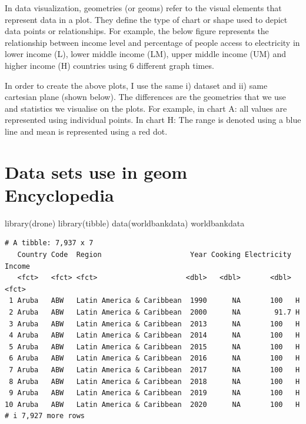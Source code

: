 \documentclass[
  letterpaper,
  DIV=11,
  numbers=noendperiod]{scrreprt}
\newenvironment{Shaded}{\begin{snugshade}}{\end{snugshade}}
\newcommand{\FunctionTok}[1]{\textcolor[rgb]{0.28,0.35,0.67}{#1}}
\newcommand{\NormalTok}[1]{\textcolor[rgb]{0.00,0.23,0.31}{#1}}
\begin{document}

In data visualization, geometries (or geoms) refer to the visual
elements that represent data in a plot. They define the type of chart or
shape used to depict data points or relationships. For example, the
below figure represents the relationship between income level and
percentage of people access to electricity in lower income (L), lower
middle income (LM), upper middle income (UM) and higher income (H)
countries using 6 different graph times.

In order to create the above plots, I use the same i) dataset and ii)
same cartesian plane (shown below). The differences are the geometries
that we use and statistics we visualise on the plots. For example, in
chart A: all values are represented using individual points. In chart H:
The range is denoted using a blue line and mean is represented using a
red dot.

\section*{Data sets use in geom
Encyclopedia}\label{data-sets-use-in-geom-encyclopedia}


\begin{Shaded}
\begin{Highlighting}[]
\FunctionTok{library}\NormalTok{(drone)}
\FunctionTok{library}\NormalTok{(tibble)}
\FunctionTok{data}\NormalTok{(worldbankdata)}
\NormalTok{worldbankdata}
\end{Highlighting}
\end{Shaded}

\begin{verbatim}
# A tibble: 7,937 x 7
   Country Code  Region                     Year Cooking Electricity Income
   <fct>   <fct> <fct>                     <dbl>   <dbl>       <dbl> <fct> 
 1 Aruba   ABW   Latin America & Caribbean  1990      NA       100   H     
 2 Aruba   ABW   Latin America & Caribbean  2000      NA        91.7 H     
 3 Aruba   ABW   Latin America & Caribbean  2013      NA       100   H     
 4 Aruba   ABW   Latin America & Caribbean  2014      NA       100   H     
 5 Aruba   ABW   Latin America & Caribbean  2015      NA       100   H     
 6 Aruba   ABW   Latin America & Caribbean  2016      NA       100   H     
 7 Aruba   ABW   Latin America & Caribbean  2017      NA       100   H     
 8 Aruba   ABW   Latin America & Caribbean  2018      NA       100   H     
 9 Aruba   ABW   Latin America & Caribbean  2019      NA       100   H     
10 Aruba   ABW   Latin America & Caribbean  2020      NA       100   H     
# i 7,927 more rows
\end{verbatim}
\end{document}
